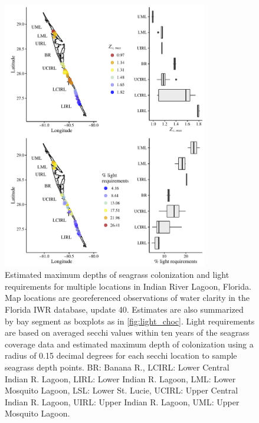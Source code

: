 \documentclass[letterpaper,12pt,oneside]{article}\usepackage[]{graphicx}\usepackage[]{color}
\begin{document}
\begin{figure}
\centering
\includegraphics[width = 0.8\textwidth]{figs/light_irl.pdf}
\caption{Estimated maximum depths of seagrass colonization and light requirements for multiple locations in Indian River Lagoon, Florida.  Map locations are georeferenced observations of water clarity in the Florida \acl{IWR} database, update 40.  Estimates are also summarized by bay segment as boxplots as in \cref{fig:light_choc}. Light requirements are based on averaged secchi values within ten years of the seagrass coverage data and estimated maximum depth of colonization using a radius of 0.15 decimal degrees for each secchi location to sample seagrass depth points. BR: Banana R., LCIRL: Lower Central Indian R. Lagoon, LIRL: Lower Indian R. Lagoon, LML: Lower Mosquito Lagoon, LSL: Lower St. Lucie, UCIRL: Upper Central Indian R. Lagoon, UIRL: Upper Indian R. Lagoon, UML: Upper Mosquito Lagoon.}
\label{fig:light_irl}
\end{figure}
\end{document}
